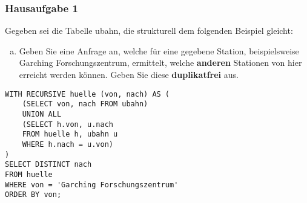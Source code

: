 \begin{frame}[fragile]
\frametitle{Hausaufgabe 1}
\vspace{0.25cm}

\begin{multicols}{2}
	Gegeben sei die Tabelle ubahn, die strukturell dem folgenden Beispiel gleicht:
	\begin{enumerate}[a)]
		\item Geben Sie eine Anfrage an, welche für eine gegebene Station,
				beispielsweise Garching Forschungszentrum, ermittelt,
				welche \textbf{anderen} Stationen von hier erreicht werden können.
				Geben Sie diese \textbf{duplikatfrei} aus.


	\end{enumerate}
	\vfill\columnbreak

	\begin{verbatim}
WITH RECURSIVE huelle (von, nach) AS (
	(SELECT von, nach FROM ubahn)
	UNION ALL
	(SELECT h.von, u.nach 
	FROM huelle h, ubahn u
	WHERE h.nach = u.von)
)
SELECT DISTINCT nach
FROM huelle
WHERE von = 'Garching Forschungszentrum'
ORDER BY von;
	\end{verbatim}
\end{multicols}
\end{frame}

